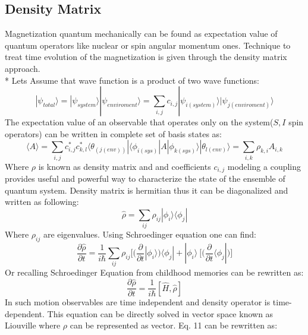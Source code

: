 \subsection{Density Matrix} 
Magnetization quantum mechanically can be found as expectation value of quantum operators like nuclear or spin angular momentum ones. Technique to treat time evolution of the magnetization is given through the density matrix approach.\\* 
Lets Assume that wave function is a product of two wave functions: 
\begin{equation}\label{eq:10}
|\psi_{total}\rangle=|\psi_{system}\rangle|\psi_{enviroment}\rangle=\sum_{i,j} c_{i,j}|\psi_{i(system)}\rangle|\psi_{j(enviroment)}\rangle
\end{equation}
The expectation value of an observable that operates only on the system($S,I$ spin operators) can be written in complete set of basis states as:
\begin{equation}\label{eq:11}
\langle A \rangle=\sum_{i,j} c_{i,j}^*c_{k,l}^*\langle \theta_{(j(env))}|\langle \phi _{i(sys)}|A|\phi_{k(sys)}\rangle|\theta_{l(env)}\rangle=\sum_{i,k}\rho_{k,i}A_{i,k}
\end{equation}
Where $\rho$ is known as density matrix and and coefficients $c_{i,j}$ modeling a coupling  provides useful and powerful way to characterize the state of the ensemble of quantum system. 
Density matrix is hermitian thus it can be diagonalized and written as following: 
\begin{equation}\label{eq:13}
\hat{\rho}=\sum_{ij}\rho_{ij}|\phi_i\rangle\langle \phi_j|
\end{equation} 
Where $\rho_{ij}$ are eigenvalues. 
Using Schroedinger equation one can find: 
\begin{equation}\label{eq:14}
\frac{\partial \hat{\rho}}{\partial t}=\frac{1}{i\hbar}\sum_{ij}\rho_{ij}\Big[\Big(\frac{\partial}{\partial t}|\phi_i\rangle\Big)\langle \phi_j|+|\phi_i\rangle\ \Big[\Big(\frac{\partial}{\partial t}\langle \phi_j|\Big)\Big]
\end{equation} 
Or recalling Schroedinger Equation from childhood memories can be rewritten as: 
 \begin{equation}\label{eq:15}
\frac{\partial \hat{\rho}}{\partial t}=\frac{1}{i\hbar}[\hat{H},\hat{\rho}]
\end{equation} 
In such motion observables are time independent and density operator is time-dependent. 
This equation can be directly solved in vector space known as Liouville where $\rho$ can be represented as vector. Eq. 11 can be rewritten as:
